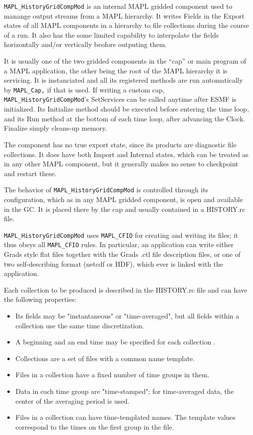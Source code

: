 {\tt MAPL\_HistoryGridCompMod} is an internal MAPL gridded component 
used to manange output streams from a MAPL hierarchy. It writes Fields in the
Export states of all MAPL components in a hierarchy to file collections
during the course of a run. It also has the some limited capability to interpolate
the fields horizontally and/or vertically beofore outputing them. 

It is usually one of the
two gridded components in the ``cap'' or main program of a MAPL application,
the other being the root of the MAPL hierarchy it is servicing. It is 
instanciated and all its registered methods are run automatically by 
{\tt MAPL\_Cap,} if that is used.
If writing a custom cap, {\tt MAPL\_HistoryGridCompMod}'s SetServices can be 
called anytime after ESMF is initialized.
Its Initialize method should be executed before entering the time loop, and its
Run method at the bottom of each time loop, after advancing the Clock. Finalize
simply cleans-up memory. 

The component has no true export state, since its products are diagnostic
file collections. It does have both Import and Internal states, which can be treated as
in any other MAPL component, but it generally makes no sense to checkpoint and restart
these.

The behavior of  {\tt MAPL\_HistoryGridCompMod} is controlled through its configuration,
which as in any MAPL gridded component, is open and available in the GC. It is placed
there by the cap and usually contained in a HISTORY.rc file.

{\tt MAPL\_HistoryGridCompMod} uses {\tt MAPL\_CFIO} for creating and writing its files;
it thus obeys all {\tt MAPL\_CFIO} rules. In particular, an application can write either
Grads style flat files together with the Grads .ctl file description files, or
one of two self-describing format (netcdf or HDF), which ever is linked with the 
application.

Each collection  to be produced is described in the HISTORY.rc file and can have the
following properties:

\begin{itemize}
\item Its fields may be "instantaneous" or "time-averaged", but all fields within
  a collection use the same time discretization. 
\item A beginning and an end time may be specified for each collection .
\item Collections are a set of files with a common name template. 
\item Files in a collection have a fixed number of time groups in them.
\item Data in each time group are "time-stamped"; for time-averaged data,
  the center of the averaging period is used.
\item Files in a collection can have time-templated names. The template
  values correspond to the times on the first group in the file.
\end{itemize}

